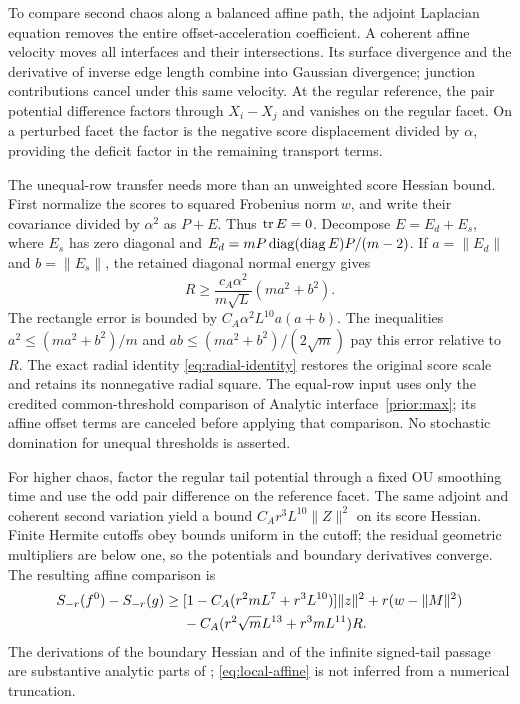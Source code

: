 To compare second chaos along a balanced affine path, the adjoint
Laplacian equation removes the entire offset-acceleration coefficient.
A coherent affine velocity moves all interfaces and their intersections.
Its surface divergence and the derivative of inverse edge length combine
into Gaussian divergence; junction contributions cancel under this same
velocity. At the regular reference, the pair potential difference factors
through $X_i-X_j$ and vanishes on the regular facet. On a perturbed facet
the factor is the negative score displacement divided by $\alpha$,
providing the deficit factor in the remaining transport terms.

The unequal-row transfer needs more than an unweighted score Hessian
bound. First normalize the scores to squared Frobenius norm $w$, and
write their covariance divided by $\alpha^2$ as $P+E$. Thus $\operatorname{tr} E=0$. Decompose
$E=E_d+E_s$, where $E_s$ has zero diagonal and
$E_d=mP\operatorname{diag}(\operatorname{diag} E)P/(m-2)$. If $a=\|E_d\|$ and $b=\|E_s\|$,
the retained diagonal normal energy gives
\[
 R\ge\frac{c_A\alpha^2}{m\sqrt L}(ma^2+b^2).
\]
The rectangle error is bounded by $C_A\alpha^2L^{10}a(a+b)$.
The inequalities $a^2\le(ma^2+b^2)/m$ and
$ab\le(ma^2+b^2)/(2\sqrt m)$ pay this error relative to $R$.
The exact radial identity \eqref{eq:radial-identity} restores the original
score scale and retains its nonnegative radial square.
The equal-row input uses only the credited common-threshold comparison
of Analytic interface~\ref{prior:max}; its affine offset terms are
canceled before applying that comparison. No stochastic domination for
unequal thresholds is asserted.

For higher chaos, factor the regular tail potential through a fixed OU
smoothing time and use the odd pair difference on the reference facet.
The same adjoint and coherent second variation yield a bound
$C_Ar^3L^{10}\|Z\|^2$ on its score Hessian. Finite Hermite cutoffs
obey bounds uniform in the cutoff; the residual geometric multipliers
are below one, so the potentials and boundary derivatives converge.
The resulting affine comparison is
\begin{align}
 S_{-r}(f^0)-S_{-r}(g)
 \ge{}&[1-C_A(r^2mL^7+r^3L^{10})]\|z\|^2
                 +r(w-\|M\|^2)\notag\\
 &-C_A(r^2\sqrt mL^{13}+r^3mL^{11})R.
 \label{eq:local-affine}
\end{align}
The derivations of the boundary Hessian and of the infinite signed-tail
passage are substantive analytic parts of \cite{localboundary,localsigned};
\eqref{eq:local-affine} is not inferred from a numerical truncation.

